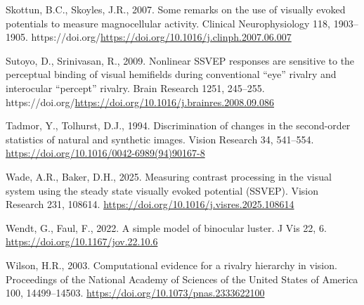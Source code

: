 \documentclass[
  12pt,
]{article}
\newlength{\cslhangindent}
\newenvironment{CSLReferences}[2] %
 {\begin{list}{}{%
  \setlength{\itemindent}{0pt}
  \setlength{\leftmargin}{0pt}
  \setlength{\parsep}{0pt}
  \ifodd #1
   \setlength{\leftmargin}{\cslhangindent}
   \setlength{\itemindent}{-1\cslhangindent}
  \fi
  \setlength{\itemsep}{#2\baselineskip}}}
 {\end{list}}
\begin{document}
\begin{CSLReferences}{1}{0}
Skottun, B.C., Skoyles, J.R., 2007. Some remarks on the use of visually
evoked potentials to measure magnocellular activity. Clinical
Neurophysiology 118, 1903--1905.
https://doi.org/\url{https://doi.org/10.1016/j.clinph.2007.06.007}

Sutoyo, D., Srinivasan, R., 2009. Nonlinear SSVEP responses are
sensitive to the perceptual binding of visual hemifields during
conventional {``eye''} rivalry and interocular {``percept''} rivalry.
Brain Research 1251, 245--255.
https://doi.org/\url{https://doi.org/10.1016/j.brainres.2008.09.086}

Tadmor, Y., Tolhurst, D.J., 1994. Discrimination of changes in the
second-order statistics of natural and synthetic images. Vision Research
34, 541--554. \url{https://doi.org/10.1016/0042-6989(94)90167-8}

Wade, A.R., Baker, D.H., 2025. Measuring contrast processing in the
visual system using the steady state visually evoked potential (SSVEP).
Vision Research 231, 108614.
\url{https://doi.org/10.1016/j.visres.2025.108614}

Wendt, G., Faul, F., 2022. A simple model of binocular luster. J Vis 22,
6. \url{https://doi.org/10.1167/jov.22.10.6}

Wilson, H.R., 2003. Computational evidence for a rivalry hierarchy in
vision. Proceedings of the National Academy of Sciences of the United
States of America 100, 14499--14503.
\url{https://doi.org/10.1073/pnas.2333622100}

\end{CSLReferences}
\end{document}
